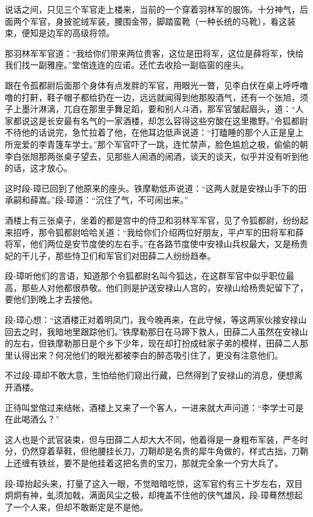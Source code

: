 \documentclass[12pt,oneside]{book}
\begin{document}
说话之间，只见三个军官走上楼来，当前的一个穿着羽林军的服饰。十分神气，后面两个军官，身披驼绒军装，腰围金带，脚踏蛮靴（一种长统的马靴），看这装束，便知是边军的高级将领。

那羽林军军官道：``我给你们带来两位贵客，这位是田将军，这位是薛将军，快给我们找一副雅座。''堂倌连连的应诺。还忙去收拾一副临窗的座头。

跟在令孤都尉后面那个身体有点发胖的军官，用眼光一瞥，见李白伏在桌上呼呼噜噜的打鼾，鞋子帽子都给扔在一边，远远就闻得到他那股酒气，还有一个张旭，须子上墨汁淋漓，兀自在那里手舞足蹈，要和别人斗酒，那军官皱起眉头，道：``人家都说这是长安最有名气的一家酒楼，却怎么容得这些穷酸在这里撒野。''令狐都尉不待他的话说完，急忙拉着了他，在他耳边低声说道：``打瞌睡的那个人正是皇上所宠爱的李青篷车学士。''那个军官吓了一跳，连忙禁声，脸色尴尬之极，偷偷的朝李白张旭那两张桌子望去，见那些人闹酒的闹酒，谈天的谈天，似乎并没有听到他的话，这才放心。

这时段-璋已回到了他原来的座头。铁摩勒低声说道：``这两人就是安禄山手下的田承嗣和薛嵩。''段-璋道：``沉住了气，不可闹出来。''

酒楼上有三张桌子，坐着的都是宫中的侍卫和羽林军军官，见了令狐都尉，纷纷起来招呼，那令狐都尉哈哈关道：``我给你们介绍两位好朋友，平卢军的田将军和薛将军，他们两位是安节度使的左右手。''在各路节度使中安禄山兵权最大，又是杨贵妃的干儿子，那些恃卫们和军官们对田薛二人纷纷趋奉。

段-璋听他们的言语，知道那个令狐都尉名叫今狐达，在这群军官中似乎职位最高，那些人对他都很恭敬。他们则是护送安禄山人宫的，安禄山给杨贵妃留下了，要他们到晚上才去接他。

段-璋心想：``这酒楼正对着明凤门，我今晚再来，在此守候，等这两家伙接安禄山回去之时，我暗地里跟踪他们。''铁摩勒那日在马蹄下救人，田薛二人虽然在安禄山的左右，但铁摩勒那日是个乡下少年，现在却打扮成硅家子弟的模样，田薛二人那里认得出来？何况他们的眼光都被李白的醉态吸引住了，更没有注意他们。

不过段-璋却不敢大意，生怕给他们窥出行藏，已然得到了安禄山的消息，便想离开酒楼。

正待叫堂倌过来结帐，酒楼上又来了一个客人，一进来就大声问道：``李学士可是在此喝酒么？''

这人也是个武官装束，但与田薛二人却大大不同，他着得是一身粗布军装，严冬时分，仍然穿着草鞋，但他腰挂长刀，刀鞘却是名贵的犀牛角做的，样式古拙，刀鞘上还缠有铁丝，要不是他挂着这把名贵的宝刀，那就完全象一个穷大兵了。

段-璋抬起头来，打量了这入一眼，不觉暗暗吃惊，这军官约有三十岁左右，双目炯炯有神，虬须加戟，满面风尘之极，却掩盖不住他的侠气雄风，段-璋蓦然想起了一个人来，但却不敢断定是不是他。
\end{document}
